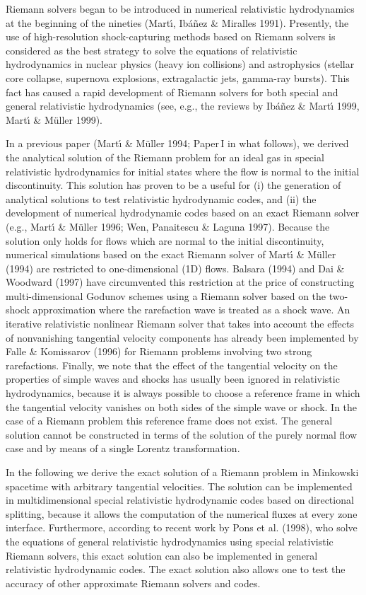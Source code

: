   Riemann solvers began to be introduced in numerical relativistic
hydrodynamics at the beginning of the nineties (Mart\'{\i}, Ib\'a\~nez
\& Miralles 1991). Presently, the use of high-resolution
shock-capturing methods based on Riemann solvers is considered as the
best strategy to solve the equations of relativistic hydrodynamics in
nuclear physics (heavy ion collisions) and astrophysics (stellar core
collapse, supernova explosions, extragalactic jets, gamma-ray
bursts). This fact has caused a rapid development of Riemann solvers
for both special and general relativistic hydrodynamics (see, e.g.,
the reviews by Ib\'a\~nez \& Mart\'{\i} 1999, Mart\'{\i} \& M\"uller
1999).

  In a previous paper (Mart\'{\i} \& M\"uller 1994; Paper\,I in what
follows), we derived the analytical solution of the Riemann problem
for an ideal gas in special relativistic hydrodynamics for initial
states where the flow is normal to the initial discontinuity. This
solution has proven to be a useful for (i) the generation of
analytical solutions to test relativistic hydrodynamic codes, and (ii)
the development of numerical hydrodynamic codes based on an exact
Riemann solver (e.g., Mart\'{\i} \& M\"uller 1996; Wen, Panaitescu \&
Laguna 1997).  Because the solution only holds for flows which are
normal to the initial discontinuity, numerical simulations based on
the exact Riemann solver of Mart\'{\i} \& M\"uller (1994) are
restricted to one-dimensional (1D) flows.  Balsara (1994) and Dai \&
Woodward (1997) have circumvented this restriction at the price of
constructing multi-dimensional Godunov schemes using a Riemann solver
based on the two-shock approximation where the rarefaction wave is
treated as a shock wave. An iterative relativistic nonlinear Riemann solver 
that takes into account the effects of nonvanishing tangential velocity 
components has already been implemented by Falle \& Komissarov (1996) for 
Riemann problems involving two strong rarefactions. Finally, we note that the 
effect of the tangential velocity on the properties of simple waves and shocks 
has usually been ignored in relativistic hydrodynamics, because it is always 
possible to choose a reference frame in which the tangential velocity vanishes 
on both sides of the simple wave or shock. In the case of a Riemann problem
this reference frame does not exist. The general solution cannot be
constructed in terms of the solution of the purely normal flow case
and by means of a single Lorentz transformation.

  In the following we derive the exact solution of a Riemann problem
in Minkowski spacetime with arbitrary tangential velocities.  The
solution can be implemented in multidimensional special relativistic
hydrodynamic codes based on directional splitting, because it allows
the computation of the numerical fluxes at every zone interface.
Furthermore, according to recent work by Pons et al. (1998), who solve
the equations of general relativistic hydrodynamics using special
relativistic Riemann solvers, this exact solution can also be
implemented in general relativistic hydrodynamic codes. The exact
solution also allows one to test the accuracy of other approximate
Riemann solvers and codes.

